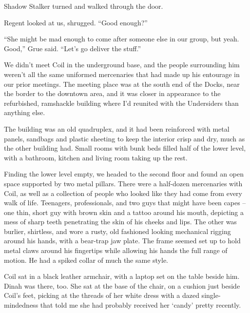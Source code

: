 Shadow Stalker turned and walked through the door.



Regent looked at us, shrugged.  ``Good enough?''



``She might be mad enough to come after someone else in our group, but yeah.  Good,'' Grue said.  ``Let's go deliver the stuff.''



\sectionbreak



We didn't meet Coil in the underground base, and the people surrounding him weren't all the same uniformed mercenaries that had made up his entourage in our prior meetings.  The meeting place was at the south end of the Docks, near the border to the downtown area, and it was closer in appearance to the refurbished, ramshackle building where I'd reunited with the Undersiders than anything else.



The building was an old quadruplex, and it had been reinforced with metal panels, sandbags and plastic sheeting to keep the interior crisp and dry, much as the other building had.  Small rooms with bunk beds filled half of the lower level, with a bathroom, kitchen and living room taking up the rest.



Finding the lower level empty, we headed to the second floor and found an open space supported by two metal pillars.  There were a half-dozen mercenaries with Coil, as well as a collection of people who looked like they had come from every walk of life.  Teenagers, professionals, and two guys that might have been capes – one thin, short guy with brown skin and a tattoo around his mouth, depicting a mess of sharp teeth penetrating the skin of his cheeks and lips.  The other was burlier, shirtless, and wore a rusty, old fashioned looking mechanical rigging around his hands, with a bear-trap jaw plate.  The frame seemed set up to hold metal claws around his fingertips while allowing his hands the full range of motion.   He had a spiked collar of much the same style.



Coil sat in a black leather armchair, with a laptop set on the table beside him.  Dinah was there, too.  She sat at the base of the chair, on a cushion just beside Coil's feet, picking at the threads of her white dress with a dazed single-mindedness that told me she had probably received her `candy' pretty recently.



